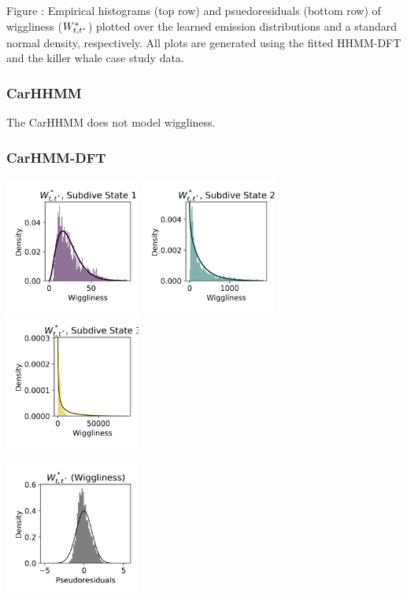 \documentclass{article}
\begin{document}
        \noindent Figure : Empirical histograms (top row) and psuedoresiduals (bottom row) of wiggliness ($W^*_{t,t^*}$) plotted over the learned emission distributions and a standard normal density, respectively. All plots are generated using the fitted HHMM-DFT and the killer whale case study data.
        \addtocounter{fignum}{1}
        
        \subsubsection{CarHHMM}
        
        The CarHHMM does not model wiggliness.
        
        \subsubsection{CarHMM-DFT}
        
        \begin{center}
        \includegraphics[width=1.75in]{../Plots/CarHMM_empirical_hist_ahat_0.png}
        \includegraphics[width=1.75in]{../Plots/CarHMM_empirical_hist_ahat_1.png}
        \includegraphics[width=1.75in]{../Plots/CarHMM_empirical_hist_ahat_2.png}
        
        \includegraphics[width=1.75in]{../Plots/CarHMM_psedoresids_ahat.png}
        \end{center}
        
\end{document}
